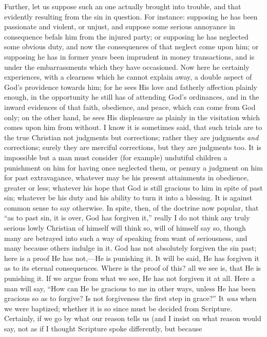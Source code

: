 Further, let us suppose such an one actually brought into trouble,
and that evidently resulting from the sin in question. For instance:
supposing he has been passionate and violent, or unjust, and suppose
some serious annoyance in consequence befals him from the injured
party; or supposing he has neglected some obvious duty, and now the
consequences of that neglect come upon him; or supposing he has in
former years been imprudent in money transactions, and is under the
embarrassments which they have occasioned. Now here he certainly
experiences, with a clearness which he cannot explain away, a double
aspect of God's providence towards him; for he sees His love and
fatherly affection plainly enough, in the opportunity he still has of
attending God's ordinances, and in the inward evidences of that faith,
obedience, and peace, which can come from God only; on the other hand,
he sees His displeasure as plainly in the visitation which comes upon
him from without. I know it is sometimes said, that such trials are to
the true Christian not judgments but corrections; rather they are
judgments \emph{and} corrections; surely they are merciful
corrections, but they are judgments too. It is impossible but a man
must consider (for example) undutiful children a punishment on him for
having once neglected them, or penury a judgment on him for past
extravagance, whatever may be his present attainments in obedience,
greater or less; whatever his hope that God is still gracious to him
in spite of past sin; whatever be his duty and his ability to turn it
into a blessing. It is against common sense to say otherwise. In
spite, then, of the doctrine now popular, that ``as to past sin,
it is over, God has forgiven it,'' really I do not think any truly
serious lowly Christian of himself will think so, will of himself say
so, though many are betrayed into such a way of speaking from want of
seriousness, and many because others indulge in it. God has not
absolutely forgiven the sin past; here is a proof He has not,—He is
punishing it. It will be said, He has forgiven it as to its eternal
consequences. Where is the proof of this? all we see is, that He is
punishing it. If we argue from what we see, He has not forgiven it at
all. Here a man will say, ``How can He be gracious to me in other
ways, unless He has been gracious so as to forgive? Is not forgiveness
the first step in grace?'' It \emph{was} when we were baptized;
whether it is so since must be decided from Scripture. Certainly, if
we go by what our reason tells us (and I insist on what reason would
say, not as if I thought Scripture spoke differently, but because
